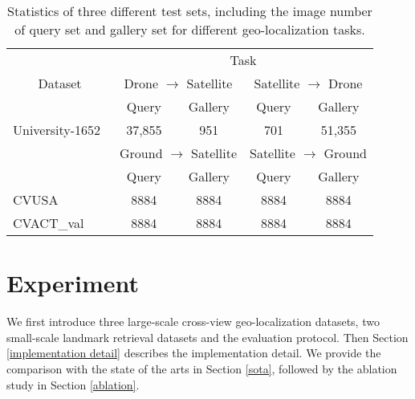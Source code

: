 \documentclass[journal]{IEEEtran}
\begin{document}
\setlength{\tabcolsep}{5pt}
\begin{table}[htb]
\small
\caption{
Statistics of three different test sets, including the image number of query set and gallery set for different geo-localization tasks.
}
\begin{center}
\begin{tabular}{l|cc|cc}
\hline
\multicolumn{1}{c|}{\multirow{3}{*}{Dataset}} & \multicolumn{4}{c}{Task} \\
\cline{2-5}
& \multicolumn{2}{c|}{Drone $\rightarrow$ Satellite} & \multicolumn{2}{c}{Satellite $\rightarrow$ Drone}\\
& Query & Gallery & Query & Gallery \\
\shline
University-1652~\cite{zheng_university-1652_nodate} & 37,855 & 951 & 701 & 51,355 \\
\hline
\cline{2-5}
& \multicolumn{2}{c|}{Ground $\rightarrow$ Satellite} & \multicolumn{2}{c}{Satellite $\rightarrow$ Ground}\\
& Query & Gallery & Query & Gallery \\
\shline
CVUSA~\cite{zhai_predicting_2017} & 8884 & 8884 & 8884 & 8884 \\
CVACT\_val~\cite{liu_lending_2019} & 8884 & 8884 & 8884 & 8884 \\
\hline
\end{tabular}
\end{center}
\label{table:statistic}
\end{table}

\section{Experiment}\label{experiment}
We first introduce three large-scale cross-view geo-localization datasets, two small-scale landmark retrieval datasets and the evaluation protocol. Then Section \ref{implementation detail} describes the implementation detail. We provide the comparison with the state of the arts in Section \ref{sota}, followed by the ablation study in Section \ref{ablation}.
\end{document}
